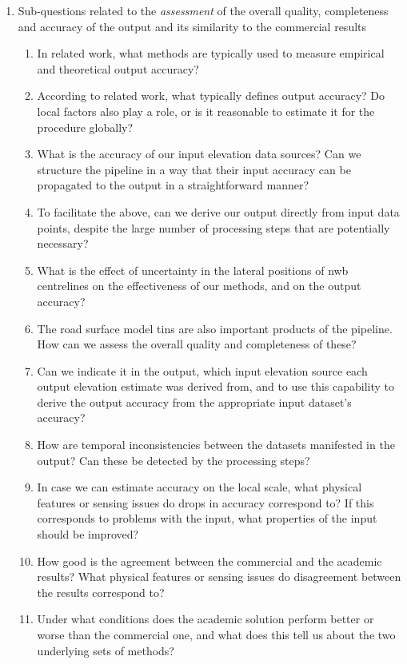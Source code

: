 \begin{enumerate}
\begin{enumerate}
    \end{enumerate}
    \item Sub-questions related to the \textit{assessment} of the overall quality, completeness and accuracy of the output and its similarity to the commercial results
    \begin{enumerate}
        \item In related work, what methods are typically used to measure empirical and theoretical output accuracy?
        \item According to related work, what typically defines output accuracy? Do local factors also play a role, or is it reasonable to estimate it for the procedure globally?
        \item What is the accuracy of our input elevation data sources? Can we structure the pipeline in a way that their input accuracy can be propagated to the output in a straightforward manner?
        \item To facilitate the above, can we derive our output directly from input data points, despite the large number of processing steps that are potentially necessary?
        \item What is the effect of uncertainty in the lateral positions of \ac{nwb} centrelines on the effectiveness of our methods, and on the output accuracy?
        \item The road surface model \ac{tin}s are also important products of the pipeline. How can we assess the overall quality and completeness of these?
        \item Can we indicate it in the output, which input elevation source each output elevation estimate was derived from, and to use this capability to derive the output accuracy from the appropriate input dataset's accuracy?
        \item How are temporal inconsistencies between the datasets manifested in the output? Can these be detected by the processing steps?
        \item In case we can estimate accuracy on the local scale, what physical features or sensing issues do drops in accuracy correspond to? If this corresponds to problems with the input, what properties of the input should be improved?
        \item How good is the agreement between the commercial and the academic results? What physical features or sensing issues do disagreement between the results correspond to?
        \item Under what conditions does the academic solution perform better or worse than the commercial one, and what does this tell us about the two underlying sets of methods?
    \end{enumerate}
\end{enumerate}